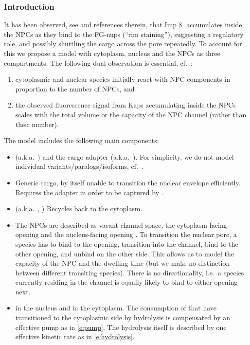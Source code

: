 \documentclass[12pt,notitlepage]{article}
\begin{document}
\subsubsection*{Introduction}

It has been observed,
see
\cite{KalitaKapinosLim2021} and references therein,
that Imp$\upbeta$ accumulates 
inside the NPCs
as they bind to the FG-nups (``rim staining''),
suggesting a regulatory role,
and
possibly shuttling
the cargo across the pore
repeatedly.
%
%
To account for this
we propose
a model
with cytoplasm, nucleus
and
the NPCs 
as three compartments.
%
%
The following dual observation is essential, cf.~\cite[\S10]{Hofmeyr2020}:
%
\begin{enumerate}
\item 
	cytoplasmic and nuclear species initially react 
	with NPC components in proportion
	to the number of NPCs,
	and
\item
	the observed fluorescence signal
	from Kaps accumulating inside the NPCs
	scales with
	the total volume or the capacity of the NPC channel
	(rather than their number).
\end{enumerate}

%
%
%

The model includes the following main components:
%
\begin{itemize}
\item
	(a.k.a.~)
	and the cargo adapter
	(a.k.a.~).
	For simplicity,
	we do not model individual variants/paralogs/isoforms,
	cf.~\cite[p.~2]{KalitaKapinosLim2021}.
\item
	Generic  cargo,
	by itself unable to transition the nuclear envelope efficiently.
	Requires the  adapter
	in order to be captured by .
\item
	(a.k.a.~, )
	Recycles  back to the cytoplasm.
\item
	The NPCs are described
	as
	vacant  channel space,
	the cytoplasm-facing opening 
	and
	the nucleus-facing opening .
	To transition the nuclear pore,
	a species has to bind to the opening,
	transition into the channel,
	bind to the other opening,
	and unbind on the other side.
	This allows us to model the capacity of the NPC
	and the dwelling time
	(but we make no distinction between different transiting species).
	There is no directionality,
	i.e.~a species currently residing in the channel is equally
	likely to bind to either opening next.
\item
	 in the nucleus and  in the cytoplasm.
	The consumption of 
	that have transitioned to the cytoplasmic side
	by hydrolysis
	is compensated by an effective pump
	as in \eqref{e:pump}.
	The hydrolysis itself is described by one 
	effective kinetic rate as in \eqref{e:hydrolysis}.
\end{itemize}
\end{document}
